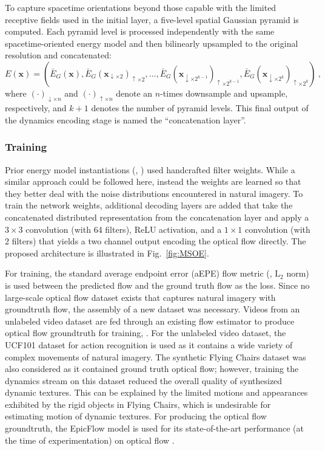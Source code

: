 To capture spacetime orientations beyond those capable
with the limited receptive fields used in the initial
layer, a five-level spatial Gaussian pyramid is computed.
Each pyramid level is processed independently
with the same spacetime-oriented energy model and then
bilinearly upsampled to the original resolution and
concatenated:
\begin{equation}
	E(\mathbf{x}) = \left( \bar{E}_G(\mathbf{x}) , \bar{E}_G(\mathbf{x}_{\downarrow\times2})_{\uparrow\times2} , \dots , \bar{E}_G(\mathbf{x}_{\downarrow\times2^{k-1}})_{\uparrow\times2^{k-1}} , \bar{E}_G(\mathbf{x}_{\downarrow\times2^k})_{\uparrow\times2^k} \right)\ ,
\end{equation}
where $(\cdot)_{\downarrow \times n}$ and $(\cdot)_{\uparrow \times n}$ denote an $n$-times downsample and upsample, respectively, and $k+1$ denotes the number of pyramid levels. This final output of the dynamics encoding stage is named the ``concatenation layer''.

\subsubsection{Training}

Prior energy model instantiations (\eg,
\cite{adelson1985spatiotemporal,derpanis2012spacetime,simoncelli1998})
used handcrafted filter weights.
While a similar approach could be followed here, instead the weights
are learned so that they better deal with the noise distributions encountered in natural imagery.
To train the network weights, additional decoding
layers are added that take the concatenated distributed
representation from the concatenation layer and apply a $3\times 3$ convolution
(with 64 filters), ReLU activation, and a $1\times 1$
convolution (with 2 filters) that yields a two channel
output encoding the optical flow directly.
The proposed architecture is illustrated in
Fig.\ \ref{fig:MSOE}.



For training, the standard average
endpoint error (aEPE) flow metric (\ie, $\text{L}_2$
norm) is used between the predicted flow and the ground truth
flow as the loss.
Since no large-scale optical flow dataset exists that captures
natural imagery with groundtruth flow, the assembly of a new dataset was necessary. Videos
from an unlabeled video dataset are fed through an existing flow
estimator to produce optical
flow groundtruth for training,
\cf \cite{tran2016}.
For the unlabeled video dataset, the UCF101
dataset for action recognition \cite{soomro2012ucf101} is used as it contains a wide variety of complex movements of natural imagery. The synthetic Flying Chairs dataset \cite{dosovitskiy2015} was also considered as it contained ground truth optical flow; however, training the dynamics stream on this dataset reduced the overall quality of synthesized dynamic textures. This can be explained by the limited motions and appearances exhibited by the rigid objects in Flying Chairs, which is undesirable for estimating motion of dynamic textures.
For producing the optical flow groundtruth, the EpicFlow \cite{revaud2015epicflow} model is used for 
its state-of-the-art performance (at the time of experimentation) on optical flow .

